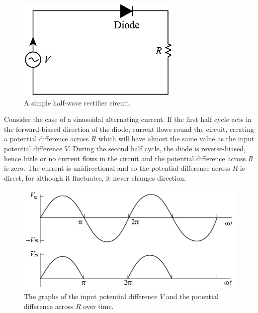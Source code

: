 \begin{figure}[H]
    \centering
    \includegraphics[scale=0.6]{media/Rectifier Circuit.png}
    \caption{A simple half-wave rectifier circuit.\protect\footnotemark}
\end{figure}

Consider the case of a sinusoidal alternating current. If the first half cycle acts in the forward-biased direction of the diode, current flows round the circuit, creating a potential difference across $R$ which will have almost the same value as the input potential difference $V$. During the second half cycle, the diode is reverse-biased, hence little or no current flows in the circuit and the potential difference across $R$ is zero. The current is unidirectional and so the potential difference across $R$ is direct, for although it fluctuates, it never changes direction.

\begin{figure}[H]
    \centering
    \includegraphics[scale=0.5]{media/Half-Wave Rectifier - Graph.png}
    \caption{The graphs of the input potential difference $V$ and the potential difference across $R$ over time.\protect\footnotemark}
\end{figure}
